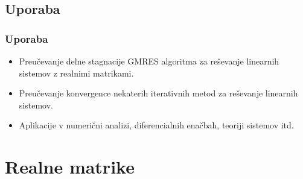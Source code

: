 \documentclass{beamer}
\begin{document}
\subsection{Uporaba}
\begin{frame}
\frametitle{Uporaba}
\begin{itemize}
\item Preučevanje delne stagnacije GMRES algoritma za reševanje linearnih sistemov z realnimi matrikami.
\item Preučevanje konvergence nekaterih iterativnih metod za reševanje linearnih sistemov.
\item Aplikacije v numerični analizi, diferencialnih enačbah, teoriji sistemov itd.
\end{itemize}
\end{frame}
\section{Realne matrike}
\end{document}
